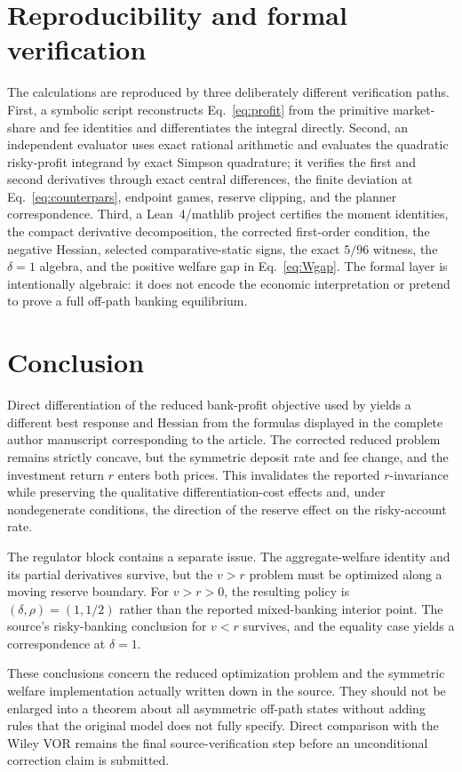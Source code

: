 \section{Reproducibility and formal verification}
The calculations are reproduced by three deliberately different verification paths. First, a symbolic script reconstructs Eq.~\eqref{eq:profit} from the primitive market-share and fee identities and differentiates the integral directly. Second, an independent evaluator uses exact rational arithmetic and evaluates the quadratic risky-profit integrand by exact Simpson quadrature; it verifies the first and second derivatives through exact central differences, the finite deviation at Eq.~\eqref{eq:counterpars}, endpoint games, reserve clipping, and the planner correspondence. Third, a Lean~4/mathlib project certifies the moment identities, the compact derivative decomposition, the corrected first-order condition, the negative Hessian, selected comparative-static signs, the exact $5/96$ witness, the $\delta=1$ algebra, and the positive welfare gap in Eq.~\eqref{eq:Wgap}. The formal layer is intentionally algebraic: it does not encode the economic interpretation or pretend to prove a full off-path banking equilibrium.

\section{Conclusion}
Direct differentiation of the reduced bank-profit objective used by \citet{ShyStenbacka2007} yields a different best response and Hessian from the formulas displayed in the complete author manuscript corresponding to the article. The corrected reduced problem remains strictly concave, but the symmetric deposit rate and fee change, and the investment return $r$ enters both prices. This invalidates the reported $r$-invariance while preserving the qualitative differentiation-cost effects and, under nondegenerate conditions, the direction of the reserve effect on the risky-account rate.

The regulator block contains a separate issue. The aggregate-welfare identity and its partial derivatives survive, but the $v>r$ problem must be optimized along a moving reserve boundary. For $v>r>0$, the resulting policy is $(\delta,\rho)=(1,1/2)$ rather than the reported mixed-banking interior point. The source's risky-banking conclusion for $v<r$ survives, and the equality case yields a correspondence at $\delta=1$.

These conclusions concern the reduced optimization problem and the symmetric welfare implementation actually written down in the source. They should not be enlarged into a theorem about all asymmetric off-path states without adding rules that the original model does not fully specify. Direct comparison with the Wiley VOR remains the final source-verification step before an unconditional correction claim is submitted.
